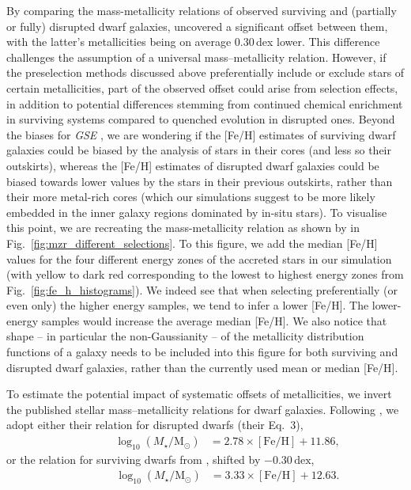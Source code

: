 \documentclass[fleqn,usenatbib]{mnras}
\begin{document}
By comparing the mass-metallicity relations of observed surviving and (partially or fully) disrupted dwarf galaxies, \citet{Naidu2022b} uncovered a significant offset between them, with the latter's metallicities being on average 0.30\,dex lower. This difference challenges the assumption of a universal mass–metallicity relation. However, if the preselection methods discussed above preferentially include or exclude stars of certain metallicities, part of the observed offset could arise from selection effects, in addition to potential differences stemming from continued chemical enrichment in surviving systems compared to quenched evolution in disrupted ones. Beyond the biases for \textit{GSE} \citep{Skuladottir2025}, we are wondering if the [Fe/H] estimates of surviving dwarf galaxies could be biased by the analysis of stars in their cores (and less so their outskirts), whereas the [Fe/H] estimates of disrupted dwarf galaxies could be biased towards lower values by the stars in their previous outskirts, rather than their more metal-rich cores (which our simulations suggest to be more likely embedded in the inner galaxy regions dominated by in-situ stars). To visualise this point, we are recreating the mass-metallicity relation as shown by \citet{Naidu2022b} in Fig.~\ref{fig:mzr_different_selections}. To this figure, we add the median [Fe/H] values for the four different energy zones of the accreted stars in our simulation (with yellow to dark red corresponding to the lowest to highest energy zones from Fig.~\ref{fig:fe_h_histograms}). We indeed see that when selecting preferentially (or even only) the higher energy samples, we tend to infer a lower [Fe/H]. The lower-energy samples would increase the average median [Fe/H]. We also notice that shape -- in particular the non-Gaussianity -- of the metallicity distribution functions of a galaxy needs to be included into this figure for both surviving and disrupted dwarf galaxies, rather than the currently used mean or median [Fe/H].

To estimate the potential impact of systematic offsets of metallicities, we invert the published stellar mass–metallicity relations for dwarf galaxies. Following \citet{Naidu2022b}, we adopt either their relation for disrupted dwarfs (their Eq.~3),
\begin{align}
\qquad\qquad    \log_{10} (M_\star/\mathrm{M_\odot}) &= 2.78 \times \mathrm{[Fe/H]} + 11.86 , \label{eq:naidu}
\end{align}
or the relation for surviving dwarfs from \citet{Kirby2013}, shifted by $-0.30\,\mathrm{dex}$,
\begin{align}
\qquad\qquad    \log_{10} (M_\star/\mathrm{M_\odot}) &= 3.33 \times \mathrm{[Fe/H]} + 12.63 . \label{eq:kirby}
\end{align}
\end{document}
